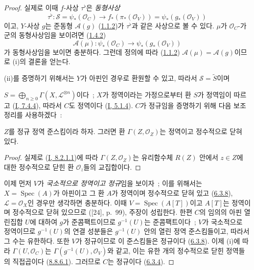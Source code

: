 \begin{proof}
실제로 이때 $f$-사상 $\tau^\flat$은 \emph{동형사상}
\[
  \tau^\flat:\mathcal{S}=\psi_*(\mathcal{O}_C)
  \longrightarrow f_*(\pi_*(\mathcal{O}_V))
  =\psi_*(g_*(\mathcal{O}_V))
\]
이고, $Y$-사상 $g$는 준동형 $\mathcal{A}(g)$
(\hyperref[II.1.1.2-ko]{1.1.2})가 $\tau^\flat$과 같은 사상으로 볼 수
있다. $\mu$가 $\mathcal{O}_C$-가군의 동형사상임을 보이려면
(\hyperref[II.1.4.2-ko]{1.4.2})
\[
  \mathcal{A}(\mu):\psi_*(\mathcal{O}_C)
  \longrightarrow\psi_*(g_*(\mathcal{O}_V))
\]
가 동형사상임을 보이면 충분하다. 그런데 정의에 따라
(\hyperref[II.1.1.2-ko]{1.1.2})
$\mathcal{A}(\mu)=\mathcal{A}(g)$이므로 (i)의 결론을 얻는다.

(ii)를 증명하기 위해서는 $Y$가 아핀인 경우로 환원할 수 있고, 따라서
$\mathcal{S}=\widetilde{S}$이며

$S=\bigoplus_{n\geqslant 0}\Gamma(X,\mathcal{L}^{\otimes n})$이다~;
$X$가 정역이라는 가정으로부터 환 $S$가 정역임이 따르고
(\hyperref[I.7.4.4-ko]{I, 7.4.4}), 따라서 $C$도 정역이다
(\hyperref[I.5.1.4-ko]{I, 5.1.4}). $C$가 정규임을 증명하기 위해 다음
보조정리를 사용하겠다~:

\begin{lemma}[8.8.6.1]
\label{II.8.8.6.1-ko}
$Z$를 정규 정역 준스킴이라 하자. 그러면 환
$\Gamma(Z,\mathcal{O}_Z)$는 정역이고 정수적으로 닫혀 있다.
\end{lemma}

\begin{proof}
실제로 (\hyperref[I.8.2.1.1-ko]{I, 8.2.1.1})에 따라
$\Gamma(Z,\mathcal{O}_Z)$는 유리함수체 $R(Z)$ 안에서 $z\in Z$에 대한
정수적으로 닫힌 환 $\mathcal{O}_z$들의 교집합이다.
\end{proof}

이제 먼저 $V$가 \emph{국소적으로 정역이고 정규}임을 보이자~; 이를 위해서는
$X=\operatorname{Spec}(A)$가 아핀이고 그 환 $A$가 정역이며 정수적으로
닫혀 있고 (\hyperref[II.6.3.8-ko]{6.3.8}),
$\mathcal{L}=\mathcal{O}_X$인 경우만 생각하면 충분하다. 이때
$V=\operatorname{Spec}(A[T])$이고 $A[T]$는 정역이며 정수적으로 닫혀
있으므로 ([24], p.~99), 주장이 성립한다. 한편 $C$의 임의의 아핀
열린집합 $U$에 대하여 $g$가 준콤팩트이므로 $g^{-1}(U)$는
준콤팩트이다~; $V$가 국소적으로 정역이므로 $g^{-1}(U)$의 연결
성분들은 $g^{-1}(U)$ 안의 열린 정역 준스킴들이고, 따라서 그 수는
유한하다. 또한 $V$가 정규이므로 이 준스킴들은 정규이다
(\hyperref[II.6.3.8-ko]{6.3.8}). 이제 (i)에 따라
$\Gamma(U,\mathcal{O}_C)$는 $\Gamma(g^{-1}(U),\mathcal{O}_V)$와 같고,
이는 유한 개의 정수적으로 닫힌 정역들의 직접곱이다
(\hyperref[II.8.8.6.1-ko]{8.8.6.1}). 그러므로 $C$는 정규이다
(\hyperref[II.6.3.4-ko]{6.3.4}).
\end{proof}


